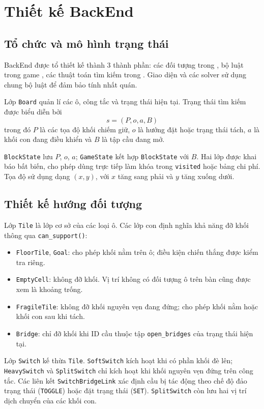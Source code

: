 \section{Thiết kế BackEnd}
\subsection{Tổ chức và mô hình trạng thái}

BackEnd được tổ thiết kế thành 3 thành phần: các đối tượng trong , bộ luật trong game
, các thuật toán tìm kiếm trong . Giao diện và các solver sử dụng chung bộ luật
để đảm bảo tính nhất quán.

Lớp \texttt{Board} quản lí các ô, công tắc và trạng thái hiện tại. Trạng thái tìm kiếm được biểu diễn bởi
\[
s=(P,o,a,B)
\]
trong đó $P$ là các tọa độ khối chiếm giữ, $o$ là hướng đặt hoặc trạng thái tách, $a$ là khối con đang điều khiển và $B$ là tập cầu đang mở.

\texttt{BlockState} lưu $P$, $o$, $a$; \texttt{GameState} kết hợp
\texttt{BlockState} với $B$. Hai lớp được khai báo bất biến, cho phép
dùng trực tiếp làm khóa trong \texttt{visited} hoặc bảng chi phí.
Tọa độ sử dụng dạng $(x,y)$, với $x$ tăng sang phải và $y$ tăng xuống dưới.

\subsection{Thiết kế hướng đối tượng}

Lớp \texttt{Tile} là lớp cơ sở của các loại ô. Các lớp con định nghĩa khả năng đỡ khối thông qua \texttt{can\_support()}:

\begin{itemize}
    \item \texttt{FloorTile}, \texttt{Goal}: cho phép khối nằm trên ô;
    điều kiện chiến thắng được kiểm tra riêng.
    \item \texttt{EmptyCell}: không đỡ khối. Vị trí không có đối tượng
    ô trên bàn cũng được xem là khoảng trống.
    \item \texttt{FragileTile}: không đỡ khối nguyên vẹn đang đứng;
    cho phép khối nằm hoặc khối con sau khi tách.
    \item \texttt{Bridge}: chỉ đỡ khối khi ID cầu thuộc tập
    \texttt{open\_bridges} của trạng thái hiện tại.
\end{itemize}

Lớp \texttt{Switch} kế thừa \texttt{Tile}. \texttt{SoftSwitch} kích hoạt
khi có phần khối đè lên; \texttt{HeavySwitch} và \texttt{SplitSwitch}
chỉ kích hoạt khi khối nguyên vẹn đứng trên công tắc.
Các liên kết \texttt{SwitchBridgeLink} xác định cầu bị tác động theo
chế độ đảo trạng thái (\texttt{TOGGLE}) hoặc đặt trạng thái
(\texttt{SET}). \texttt{SplitSwitch} còn lưu hai vị trí dịch chuyển
của các khối con.

